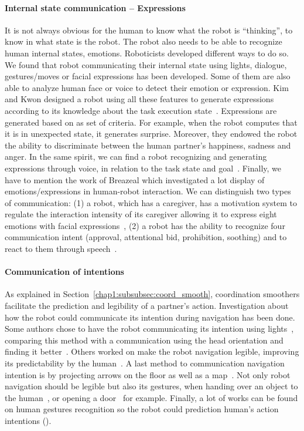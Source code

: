\documentclass[a4paper,11pt,twoside]{StyleThese}
\begin{document}
\paragraph{Internal state communication -- Expressions}
It is not always obvious for the human to know what the robot is ``thinking'', \ie to know in what state is the robot. The robot also needs to be able to recognize human internal states, emotions. Roboticists developed different ways to do so. We found that robot communicating their internal state using lights, dialogue, gestures/moves or facial expressions has been developed. Some of them are also able to analyze human face or voice to detect their emotion or expression. Kim and Kwon designed a robot using all these features to generate expressions according to its knowledge about the task execution state~\cite{kim_2010_computational}. Expressions are generated based on as set of criteria. For example, when the robot computes that it is in unexpected state, it generates surprise. Moreover, they endowed the robot the ability to discriminate between the human partner's happiness, sadness and anger. In the same spirit, we can find a robot recognizing and generating expressions through voice, in relation to the task state and goal~\cite{scheutz_2006_utility}. Finally, we have to mention the work of Breazeal which investigated a lot display of emotions/expressions in human-robot interaction. We can distinguish two types of communication: (1) a robot, which has a caregiver, has a motivation system to regulate the interaction intensity of its caregiver allowing it to express eight emotions with facial expressions~\cite{breazeal_1998_motivational, breazeal_2004_function}, (2) a robot has the ability to recognize four communication intent (approval, attentional bid, prohibition, soothing) and to react to them through speech~\cite{breazeal_2002_regulation, breazeal_2003_emotion}.

\paragraph{Communication of intentions} As explained in Section~\ref{chap1:subsubsec:coord_smooth}, coordination smoothers facilitate the prediction and legibility of a partner's action. Investigation about how the robot could communicate its intention during navigation has been done. Some authors chose to have the robot communicating its intention using lights~\cite{szafir_2015_communicating}, comparing this method with a communication using the head orientation and finding it better~\cite{may_2015_show}. Others worked on make the robot navigation legible, improving its predictability by the human~\cite{dragan_2013_legibility, alami_2006_toward}. A last method to communication navigation intention is by projecting arrows on the floor as well as a map~\cite{chadalavada_2015_mind, coovert_2014_spatial}.  Not only robot navigation should be legible but also its gestures, when handing over an object to the human~\cite{sisbot_2012_human}, or opening a door~\cite{takayama_2011_expressing} for example. Finally, a lot of works can be found on human gestures recognition so the robot could prediction human's action intentions (\eg\cite{barros_2017_dynamic, chang_2018_effects}).
\end{document}
